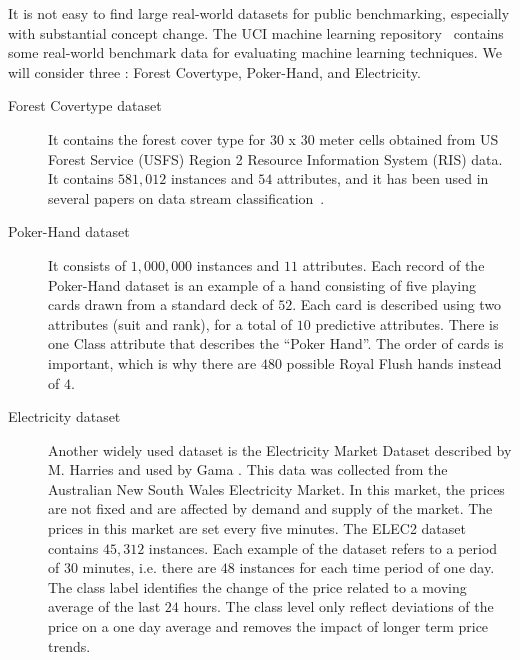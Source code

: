 It is not easy to find large real-world datasets
for public benchmarking, especially with substantial concept change. %
The UCI machine learning repository~\cite{uci} contains some real-world benchmark 
data for evaluating machine learning techniques. 
We will consider three : Forest Covertype, Poker-Hand, and Electricity.
\begin{description}
 \item[Forest Covertype dataset] It contains 
the forest cover type for 30 x 30 meter cells obtained from US Forest Service (USFS) Region 2 Resource Information System (RIS) data. 
It contains $581,012$ instances and $54$ attributes, and
it has been used
in several papers on data stream classification~\cite{vfdtc, ozaexp}.
 \item[Poker-Hand dataset] %
It consists of $1,000,000$ %
instances and $11$ attributes.
Each record of the Poker-Hand dataset is an example of a hand consisting of five playing cards drawn from a standard deck of $52$. Each card is described using two attributes (suit and rank), for a total of $10$ predictive attributes. There is one Class attribute that describes the ``Poker Hand''. The order of cards is important, which is why there are $480$ possible Royal Flush hands instead of $4$.
\item[Electricity dataset] 
Another widely used dataset is the Electricity Market Dataset described by M. Harries \cite{Harries} 
and used by Gama \cite{Gama}. 
This data was collected from the Australian New South Wales Electricity Market. 
In this market, the prices are not fixed and are affected by demand and supply of the market. 
The prices in this market are set every five minutes. 
The ELEC2 dataset contains $45,312$ instances. %
Each example of the dataset refers to a period of $30$ minutes, i.e. there are $48$ instances
for each time period of one day. %
The class label identifies the change of the price related to a moving average of
the last $24$ hours. The class level only reflect deviations of the price on a one
day average and removes the impact of longer term price trends. 
 \end{description}
 
